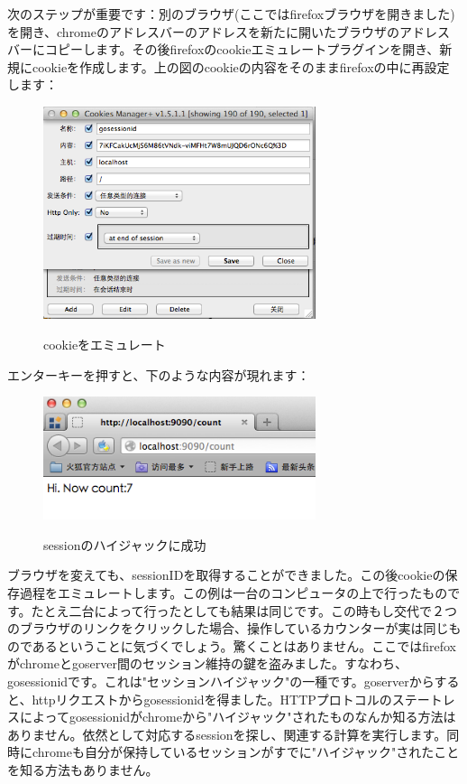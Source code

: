 次のステップが重要です：別のブラウザ(ここではfirefoxブラウザを開きました)を開き、chromeのアドレスバーのアドレスを新たに開いたブラウザのアドレスバーにコピーします。その後firefoxのcookieエミュレートプラグインを開き、新規にcookieを作成します。上の図のcookieの内容をそのままfirefoxの中に再設定します：

\begin{figure}[H]
  \includegraphics[width=8cm]{6.4.setcookie.png}
   \label{図6.6}
   \caption{cookieをエミュレート}
\end{figure}

エンターキーを押すと、下のような内容が現れます：

\begin{figure}[H]
  \includegraphics[width=8cm]{6.4.hijacksuccess.png}
   \label{図6.7}
   \caption{sessionのハイジャックに成功}
\end{figure}

ブラウザを変えても、sessionIDを取得することができました。この後cookieの保存過程をエミュレートします。この例は一台のコンピュータの上で行ったものです。たとえ二台によって行ったとしても結果は同じです。この時もし交代で２つのブラウザのリンクをクリックした場合、操作しているカウンターが実は同じものであるということに気づくでしょう。驚くことはありません。ここではfirefoxがchromeとgoserver間のセッション維持の鍵を盗みました。すなわち、gosessionidです。これは"セッションハイジャック"の一種です。goserverからすると、httpリクエストからgosessionidを得ました。HTTPプロトコルのステートレスによってgosessionidがchromeから"ハイジャック"されたものなんか知る方法はありません。依然として対応するsessionを探し、関連する計算を実行します。同時にchromeも自分が保持しているセッションがすでに"ハイジャック"されたことを知る方法もありません。

